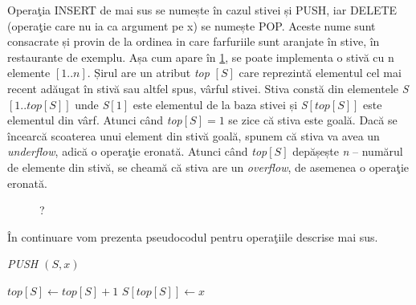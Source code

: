Operaţia INSERT de mai sus se numește în cazul stivei și PUSH, iar DELETE (operaţie care nu ia ca argument pe x) se numește POP. Aceste nume sunt consacrate și provin de la ordinea in care farfuriile sunt aranjate în stive, în restaurante de exemplu.
Așa cum apare în \ref{fig:structuriDate1}, se poate implementa o stivă cu n elemente $\left [ 1..n \right ]$. Șirul are un atribut \textit{top} $\left [ S \right ] $ care reprezintă elementul cel mai recent adăugat în stivă sau altfel spus, vârful stivei.
Stiva constă din elementele \textit{S}$\left [ 1..\textit{top} \left [ S \right ] \right ]$ unde \textit{S}$\left [ 1 \right ]$ este elementul de la baza stivei și \textit{S}$\left [ \textit{top}\left [ S \right ] \right ]$ este elementul din vârf.
Atunci când \textit{top}$\left [ S \right ] = 1$ se zice că stiva este goală. Dacă se încearcă scoaterea unui element din stivă goală, spunem că stiva va avea un \textit{underflow}, adică o operaţie eronată.
Atunci când \textit{top}$\left [ S \right ]$ depășește \textit{n} – numărul de elemente din stivă, se cheamă că stiva are un \textit{overflow}, de asemenea o operaţie eronată.

\begin{figure}[ht] %
	\centering	
		\caption{?} 
		\label{fig:structuriDate1}
	\end{figure}


În continuare vom prezenta pseudocodul pentru operaţiile descrise mai sus.

\begin{algorithm}
	\caption{\textit{PUSH $\left ( S, x \right )$}}\label{alg:stiva_push}
	\begin{algorithmic}[1]
		\State $top[S]\gets top[S] + 1$
		\State $S[top[S]]\gets x$
	\end{algorithmic}
\end{algorithm}




